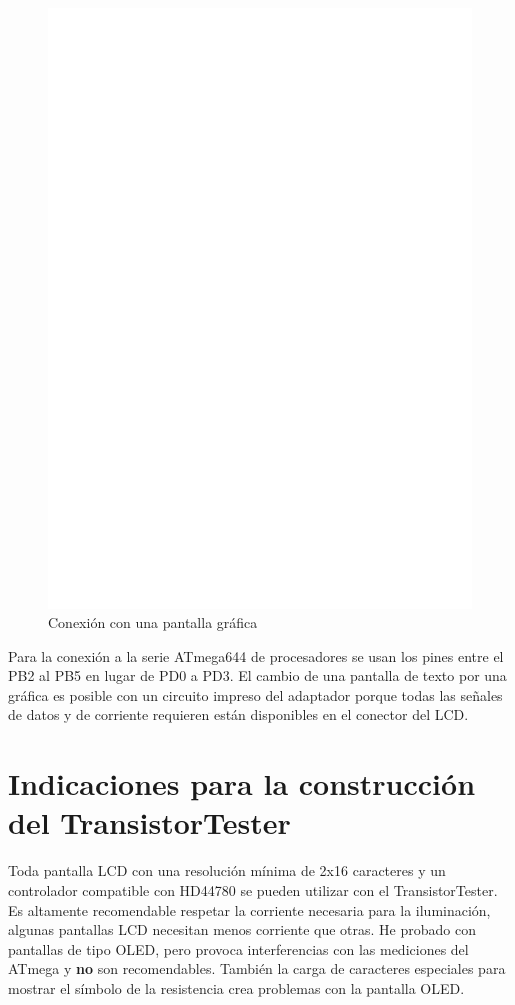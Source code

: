 \begin{figure}[H]
\centering
\includegraphics[width=14cm]{../FIG/ST7565lcd.eps}
\caption{Conexión con una pantalla gráfica}
\label{fig:ST7565lcd}
\end{figure}

Para la conexión a la serie  ATmega644 de procesadores se usan los pines entre el PB2 al PB5  en lugar de PD0 a PD3. El
cambio de  una pantalla de  texto por una  gráfica es posible con  un circuito impreso  del adaptador porque  todas las
señales de datos y de corriente requieren están disponibles en el conector del LCD.

\section{Indicaciones para la construcción del TransistorTester}

Toda pantalla  LCD con una  resolución mínima de  2x16 caracteres  y un controlador  compatible con HD44780  se pueden
utilizar  con el  TransistorTester. Es  altamente recomendable  respetar la  corriente necesaria  para la  iluminación,
algunas  pantallas LCD  necesitan  menos corriente  que otras.  He  probado con  pantallas  de tipo  OLED, pero  provoca
interferencias con las mediciones del ATmega y \textbf{no} son recomendables. También la carga de caracteres especiales
para mostrar el símbolo de la resistencia crea problemas con la pantalla OLED.

